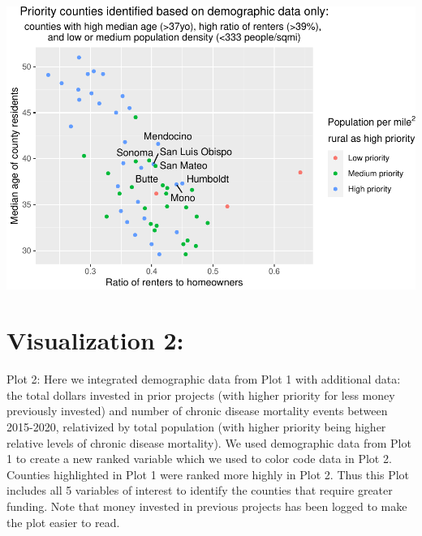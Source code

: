 \documentclass[
]{article}
\begin{document}
\includegraphics{Milestone-4-R-Project_files/figure-latex/unnamed-chunk-6-1.pdf}

\newpage

\hypertarget{visualization-2}{%
\section{Visualization 2:}\label{visualization-2}}

Plot 2: Here we integrated demographic data from Plot 1 with additional
data: the total dollars invested in prior projects (with higher priority
for less money previously invested) and number of chronic disease
mortality events between 2015-2020, relativized by total population
(with higher priority being higher relative levels of chronic disease
mortality). We used demographic data from Plot 1 to create a new ranked
variable which we used to color code data in Plot 2. Counties
highlighted in Plot 1 were ranked more highly in Plot 2. Thus this Plot
includes all 5 variables of interest to identify the counties that
require greater funding. Note that money invested in previous projects
has been logged to make the plot easier to read.
\end{document}
